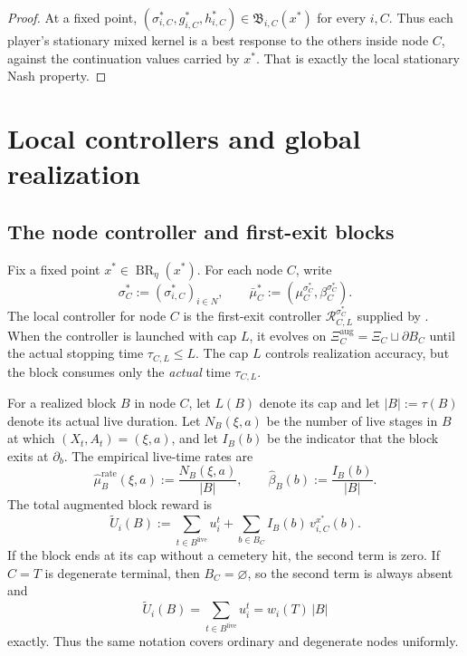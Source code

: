\documentclass[12pt]{article}
\theoremstyle{definition}
\newcommand{\1}{\mathbf{1}}
\DeclareMathOperator{\BR}{BR}
\begin{document}
\begin{proof}
At a fixed point,
$(\sigma_{i,C}^*,g_{i,C}^*,h_{i,C}^*)\in\mathfrak B_{i,C}(x^*)$ for every $i,C$.
Thus each player's stationary mixed kernel is a best response to the others inside
node $C$, against the continuation values carried by $x^*$. That is exactly the
local stationary Nash property.
\end{proof}

\section{Local controllers and global realization}
\label{sec:realization}


\subsection{The node controller and first-exit blocks}

Fix a fixed point $x^*\in\BR_\eta(x^*)$. For each node $C$, write
\[
\sigma_C^*:=(\sigma_{i,C}^*)_{i\in N},
\qquad
\bar\mu_C^*:=(\mu_C^{\sigma_C^*},\beta_C^{\sigma_C^*}).
\]
The local controller for node $C$ is the first-exit controller
$\mathcal R_{C,L}^{\sigma_C^*}$ supplied by . When the
controller is launched with cap $L$, it evolves on
$\Xi_C^{\mathrm{aug}}=\Xi_C\sqcup\partial B_C$ until the actual stopping time
$\tau_{C,L}\le L$. The cap $L$ controls realization accuracy, but the block
consumes only the \emph{actual} time $\tau_{C,L}$.

For a realized block $B$ in node $C$, let $L(B)$ denote its cap and let
$|B|:=\tau(B)$ denote its actual live duration. Let
$N_B(\xi,a)$ be the number of live stages in $B$ at which $(X_t,A_t)=(\xi,a)$, and
let $I_B(b)$ be the indicator that the block exits at $\partial_b$. The empirical
live-time rates are
\[
\widehat\mu_B^{\mathrm{rate}}(\xi,a):=\frac{N_B(\xi,a)}{|B|},
\qquad
\widehat\beta_B(b):=\frac{I_B(b)}{|B|}.
\]
The total augmented block reward is
\begin{equation}
\label{eq:aug-block-payoff}
\widetilde U_i(B)
:=
\sum_{t\in B^{\mathrm{live}}} u_i^t
+
\sum_{b\in B_C}I_B(b)\,v_{i,C}^{x^*}(b).
\end{equation}
If the block ends at its cap without a cemetery hit, the second term is zero.
If $C=T$ is degenerate terminal, then $B_C=\varnothing$, so the second term is
always absent and
\[
\widetilde U_i(B)=\sum_{t\in B^{\mathrm{live}}}u_i^t = w_i(T)\,|B|
\]
exactly. Thus the same notation covers ordinary and degenerate nodes uniformly.
\end{document}
